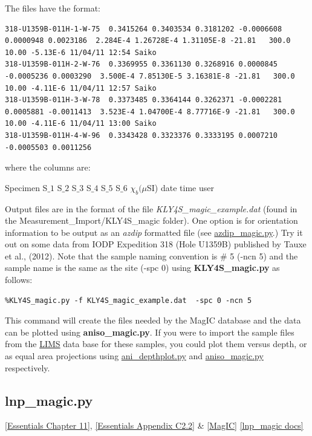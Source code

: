 \documentclass[11pt]{book}
\begin{document}
{{{The files have the format:
\begin{verbatim}
318-U1359B-011H-1-W-75  0.3415264 0.3403534 0.3181202 -0.0006608 0.0000948 0.0023186  2.284E-4 1.26728E-4 1.31105E-8 -21.81   300.0   10.00 -5.13E-6 11/04/11 12:54 Saiko
318-U1359B-011H-2-W-76  0.3369955 0.3361130 0.3268916 0.0000845 -0.0005236 0.0003290  3.500E-4 7.85130E-5 3.16381E-8 -21.81   300.0   10.00 -4.11E-6 11/04/11 12:57 Saiko
318-U1359B-011H-3-W-78  0.3373485 0.3364144 0.3262371 -0.0002281 0.0005881 -0.0011413  3.523E-4 1.04700E-4 8.77716E-9 -21.81   300.0   10.00 -4.11E-6 11/04/11 13:00 Saiko
318-U1359B-011H-4-W-96  0.3343428 0.3323376 0.3333195 0.0007210 -0.0005503 0.0011256 
 \end{verbatim}
 where the columns are:

 Specimen S$\_1$  S$\_2$ S$\_3$  S$\_4$ S$\_5$ S$\_6$ $\chi_b (\mu$SI) date time user


Output files are in the format of the file {\it KLY4S\_magic\_example.dat} (found in the Measurement\_Import/KLY4S\_magic folder).  One option is for orientation information to be output as an {\it azdip} formatted file (see \href{#azdip_magic.py}{azdip\_magic.py}.)   
Try it out on some data from IODP Expedition 318 (Hole U1359B) published by Tauxe et al., (2012).  Note that the sample naming convention is \# 5 (-ncn 5)  and the sample name is the same as the site (-spc 0) \nocite{tauxe12} using  {\bf KLY4S\_magic.py} as follows: 

\begin{verbatim}
%KLY4S_magic.py -f KLY4S_magic_example.dat  -spc 0 -ncn 5
\end{verbatim}

This command will create the files needed by the MagIC database and the data can be plotted using {\bf aniso\_magic.py}.    If you were to import the sample files from the \href{#LIMS}{LIMS} data base for these samples, you could plot them versus depth, or as equal area projections using \href{#ani_depthplot.py}{ani\_depthplot.py} and \href{#aniso_magic.py}{aniso\_magic.py} respectively.     





\subsection{lnp\_magic.py}
\href{http://magician.ucsd.edu/Essentials_2/WebBook2ch11.html#ch11}{ [Essentials Chapter 11]},  \href{http://magician.ucsd.edu/Essentials_2/WebBook2ap3.html#linesNplanes}{[Essentials Appendix C2.2]} \& \href{#MagIC}{[MagIC]}
\href{http://earthref.org/PmagPy/pmagpydocs/lnp_magic-module.html}{[lnp\_magic docs]}

}}}
\end{document}
